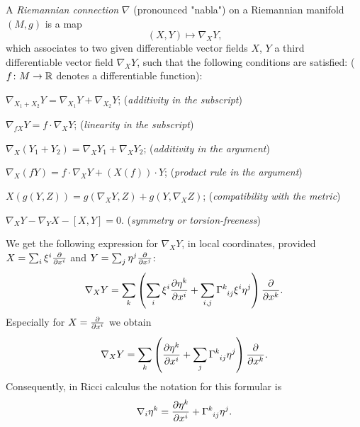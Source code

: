\documentclass[../main.tex]{subfiles}
\begin{document}
\begin{definition}\label{Manifold:Connection}
A \textit{Riemannian connection} \(\nabla\) (pronounced "nabla")
on a Riemannian manifold \(\left(M,g\right)\) is a map
\[\left(X,Y\right)\mapsto\nabla_XY\text{,}\]
which associates to two given differentiable vector fields \(X\), \(Y\)
a third differentiable vector field \(\nabla_XY\),
such that the following conditions are satisfied: (\(f\colon M\to\mathbb{R}\) denotes a differentiable function):
\begin{APAenumerate}
\item \(\nabla_{X_1+X_2}Y=\nabla_{X_1}Y+\nabla_{X_2}Y\); (\textit{additivity in the subscript})
\item \(\nabla_{fX}Y=f\cdot\nabla_{X}Y\); (\textit{linearity in the subscript})
\item \(\nabla_X\left(Y_1+Y_2\right)=\nabla_XY_1+\nabla_XY_2\); (\textit{additivity in the argument})
\item \(\nabla_X\left(fY\right)=f\cdot\nabla_XY+\left(X\left(f\right)\right)\cdot Y\); (\textit{product rule in the argument})
\item \(X\left(g\left(Y,Z\right)\right)=g\left(\nabla_XY,Z\right)+g\left(Y,\nabla_XZ\right)\); (\textit{compatibility with the metric})
\item \(\nabla_XY-\nabla_YX-\left[X,Y\right]=0\). (\textit{symmetry or torsion-freeness})
\end{APAenumerate}
\end{definition}
\begin{remark}
We get the following expression for \(\nabla_XY\), in local coordinates, provided \(X=\sum_i\tensor{\xi}{^i}\frac{\partial}{\partial\tensor{x}{^i}}\) and \(Y=\sum_j\tensor{\eta}{^j}\frac{\partial}{\partial\tensor{x}{^j}}\):
\[
\nabla_XY=\sum_k\left(\sum_i\tensor{\xi}{^i}\frac{\partial\tensor{\eta}{^k}}{\partial\tensor{x}{^i}}+\sum_{i,j}\tensor{\Gamma}{^k_i_j}\tensor{\xi}{^i}\tensor{\eta}{^j}\right)\frac{\partial}{\partial\tensor{x}{^k}}\text{.}
\]
Especially for \(X=\frac{\partial}{\partial\tensor{x}{^i}}\) we obtain
\[
\nabla_XY=\sum_k\left(\frac{\partial\tensor{\eta}{^k}}{\partial\tensor{x}{^i}}+\sum_j\tensor{\Gamma}{^k_i_j}\tensor{\eta}{^j}\right)\frac{\partial}{\partial\tensor{x}{^k}}\text{.}
\]
Consequently, in Ricci calculus the notation for this formular is
\[
\nabla_i\tensor{\eta}{^k}=\frac{\partial\tensor{\eta}{^k}}{\partial\tensor{x}{^i}}+\tensor{\Gamma}{^k_i_j}\tensor{\eta}{^j}\text{.}
\]
\end{remark}
\end{document}
